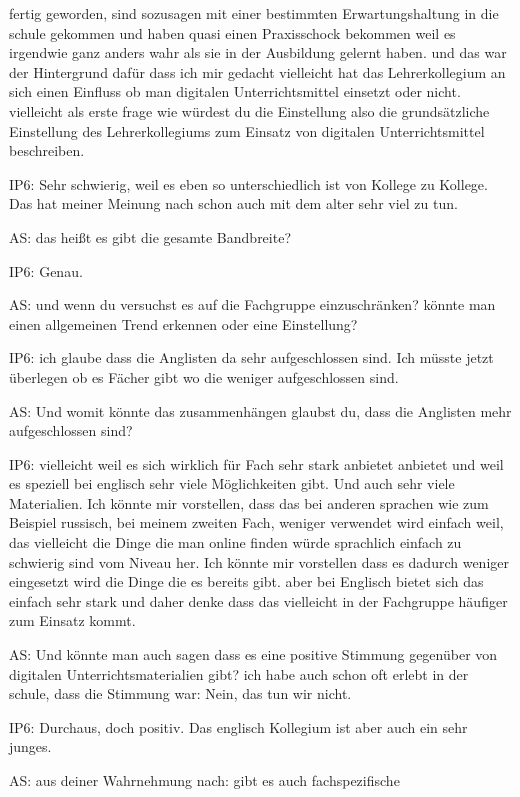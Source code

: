\documentclass[fontsize=11pt,paper=a4]{scrbook}
\begin{document}
{\begin{itemize*}
fertig geworden, sind sozusagen mit einer 
bestimmten Erwartungshaltung in die
schule gekommen und haben quasi
einen Praxisschock bekommen weil es
irgendwie ganz anders wahr als sie in
der Ausbildung gelernt haben. und das war
der Hintergrund dafür dass ich mir
gedacht vielleicht hat das
Lehrerkollegium an sich einen Einfluss
ob man digitalen Unterrichtsmittel
einsetzt oder nicht. vielleicht als erste
frage wie würdest du die Einstellung
also die grundsätzliche Einstellung des
Lehrerkollegiums zum Einsatz von digitalen Unterrichtsmittel beschreiben.
\item[IP6:] Sehr schwierig, weil es eben so unterschiedlich ist von Kollege zu
Kollege. Das hat meiner
Meinung nach schon auch mit dem
alter sehr viel zu tun.
\item[AS:] das heißt es gibt die
gesamte Bandbreite?
\item[IP6:] Genau.
\item[AS:]  und wenn du versuchst es auf die Fachgruppe
einzuschränken?
könnte man einen allgemeinen Trend erkennen oder eine
Einstellung?
\item[IP6:]  ich glaube dass die Anglisten da sehr aufgeschlossen
sind. Ich müsste jetzt überlegen ob es Fächer gibt wo die 
 weniger aufgeschlossen sind.
 \item[AS:] Und womit könnte das zusammenhängen glaubst du, dass die Anglisten mehr aufgeschlossen sind?
 \item[IP6:] vielleicht weil es sich wirklich für Fach sehr stark anbietet anbietet
und weil es speziell bei englisch sehr viele Möglichkeiten gibt. Und auch sehr viele Materialien. Ich könnte mir
vorstellen, dass das bei anderen sprachen
wie zum Beispiel russisch, bei meinem zweiten Fach, weniger verwendet wird
einfach weil, das vielleicht die Dinge die
man online finden würde
sprachlich einfach zu schwierig sind vom
Niveau her. Ich könnte mir
vorstellen dass es dadurch weniger
eingesetzt wird die Dinge die es bereits
gibt. aber bei Englisch bietet sich das
einfach sehr stark und daher denke dass
das vielleicht in der Fachgruppe häufiger zum Einsatz
kommt.
\item[AS:] Und könnte man auch sagen dass es
eine positive Stimmung gegenüber von digitalen Unterrichtsmaterialien gibt? ich habe auch schon
oft erlebt in der schule, dass die Stimmung war: Nein, das tun wir nicht.
\item[IP6:] Durchaus, doch positiv. Das englisch Kollegium ist aber auch ein
sehr junges.
\item[AS:] aus deiner Wahrnehmung nach:
gibt es auch fachspezifische

\end{itemize*}}
\end{document}
